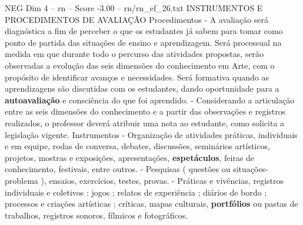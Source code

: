 \begin{textsample}{NEG Dim 4 – rn – Score -3.00 – rn/rn\_ef\_26.txt}  \label{ex:f4_neg_202}
INSTRUMENTOS E PROCEDIMENTOS DE AVALIAÇÃO Procedimentos - A avaliação será diagnóstica a fim de perceber o que os estudantes já sabem para tomar como ponto de partida das situações de ensino e aprendizagem.
Será processual na medida em que durante todo o percurso das atividades propostas, serão observadas a evolução das seis dimensões do conhecimento em Arte, com o propósito de identificar avanços e necessidades.
Será formativa quando as aprendizagens são discutidas com os estudantes, dando oportunidade para a \textbf{autoavaliação} e consciência do que foi aprendido. - Considerando a articulação entre as seis dimensões do conhecimento e a partir das observações e registros realizados, o professor deverá atribuir uma nota ao estudante, como solicita a legislação vigente.
Instrumentos - Organização de atividades práticas, individuais e em equipe, rodas de conversa, debates, discussões, seminários artísticos, projetos, mostras e exposições, apresentações, \textbf{espetáculos}, feiras de conhecimento, festivais, entre outros. - Pesquisas ( questões ou situações-problema ), ensaios, exercícios, testes, provas. - Práticas e vivências, registros individuais e coletivos : jogos ; relatos de experiência ; diários de bordo ; processos e criações artísticas ; críticas, mapas culturais, \textbf{portfólios} ou pastas de trabalhos, registros sonoros, fílmicos e fotográficos.

\end{textsample}
